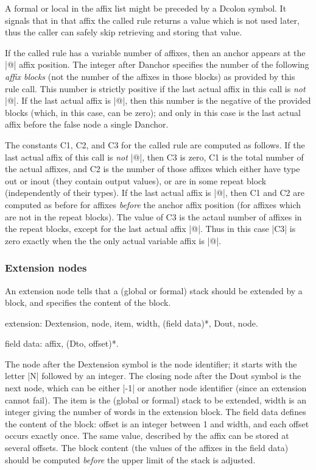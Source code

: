 \documentclass[titlepage]{article}
\newcommand\g[1]{\textsf{#1}}
\newenvironment{grammar}{%
\begin{list}{}{%
\setlength\leftmargin{18pt}%
\setlength\rightmargin{-5pt}%
\setlength\listparindent{20pt}%
\setlength\itemsep{1pt plus0.2ex}%
\setlength\parsep{0pt plus 2pt}%
\setlength\labelsep{-5pt}%
}\sf\mkoptions%
}{\end{list}}
\begin{document}
A \g{formal} or \g{local} in the affix list might be preceded by a
\g{Dcolon} symbol. It signals that in that affix the called rule returns a
value which is not used later, thus the caller can safely skip retrieving
and storing that value.

\smallskip

If the called rule has a variable number of affixes, then an \g{anchor}
appears at the \pp|@| affix position. The \g{integer} after \g{Danchor}
specifies the number of the following \emph{affix blocks} (not the number of
the affixes in those blocks) as provided by this rule call. This number is
strictly positive if the last actual affix in this call is \emph{not}
\pp|@|. If the last actual affix is \pp|@|, then this number is the negative
of the provided blocks (which, in this case, can be zero); and only in this
case is the last actual affix before the \g{false node} a single
\g{Danchor}.

\smallskip

The constants \g{C1}, \g{C2}, and \g{C3} for the called rule are computed as
follows. If the last actual affix of this call is \emph{not} \pp|@|, then
\g{C3} is zero, \g{C1} is the total number of the actual affixes, and \g{C2}
is the number of those affixes which either have type out or inout (they
contain output values), or are in some repeat block (independently of their
types). If the last actual affix is \pp|@|, then \g{C1} and \g{C2} are
computed as before for affixes \emph{before} the anchor affix position (for
affixes which are not in the repeat blocks). The value of \g{C3} is the
actaul number of affixes in the repeat blocks, except for the last actual
affix \pp|@|. Thus in this case \pp|C3| is zero exactly when the the only
actual variable affix is \pp|@|.

\subsubsection{Extension nodes}

An extension node tells that a (global or formal) stack should be
extended by a block, and specifies the content of the block.
\begin{grammar}
\item extension: Dextension, node, item, width, (field data)*, Dout, node.
\item field data: affix, (Dto, offset)*.
\end{grammar}
The \g{node} after the \g{Dextension} symbol is the node identifier; it
starts with the letter \pp|N| followed by an integer. The closing \g{node}
after the \g{Dout} symbol is the next node, which can be either \pp|-1| or
another node identifier (since an extension cannot fail). The \g{item} is 
the (global or formal) stack to be
extended, \g{width} is an integer giving the number of words in the
extension block. The \g{field data} defines the content of the block: \g{offset}
is an integer between 1 and \g{width}, and each offset occurs exactly once. The
same value, described by the \g{affix} can be stored at several offsets. The
block content (the values of the \g{affix}es in the \g{field data}) should
be computed \emph{before} the upper limit of the stack is adjusted.
\end{document}
